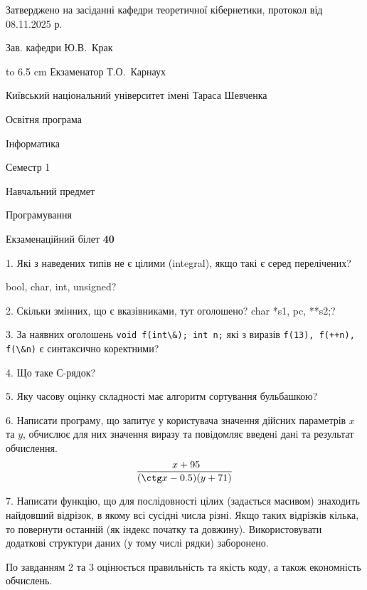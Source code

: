 \documentclass[12pt, ukrainian]{article}
\def\code#1{\Verb!#1!}
\begin{document}
{\smallskip\smallskip \begin {scriptsize} Затверджено на засіданні кафедри теоретичної кібернетики, протокол   від   08.11.2025 р.\par\smallskip\smallskip\smallskip\smallskip
{\parbox {6.5 cm} {Зав. кафедри \dotfill Ю.В.~Крак}}\hspace {0.7cm} {\hbox to 6.5 cm { Екзаменатор \dotfill Т.О.~Карнаух}} \end{scriptsize}}
\vspace{0.9cm}
{{\begin {scriptsize}\par
{ \center  Київський національний університет імені Тараса Шевченка \par}
{\parbox {5 cm}{Освітня програма \hfill}{\parbox {7 cm}{Інформатика\hfill}}\parbox {6 cm}{\hfill Семестр 1}}\par
{\parbox {5 cm} {Навчальний предмет \hfill}\parbox {7 cm}{Програмування \hfill}\parbox {6cm}{\hfill}\par}\vspace{-15pt} \end{scriptsize}}{\center Екзаменаційний білет \No \textbf { 40 }\par}}
{%
1. Які з наведених типів не є цілими (integral), якщо такі є серед перелічених?

bool, char, int, unsigned?
\par
\vspace{2mm}
2. Скільки змінних, що є вказівниками, тут оголошено?
char *s1, pc, **s2;?
\par
\vspace{2mm}
3. За наявних оголошень \code{void f(int\&); int n;} які з виразів \code{f(13), f(++n), f(\&n)} є синтаксично коректними?
\par
\vspace{2mm}
4. Що таке С-рядок?
\par
\vspace{2mm}
5. Яку часову оцінку складності має алгоритм сортування бульбашкою?
\par
\vspace{2mm}
6. Написати програму, що запитує у користувача значення дійсних параметрів $x$ та $y$, обчислює для них значення виразу та повiдомляє введенi данi та результат обчислення.
$$\frac{\ x + 95}{(\ctg x - 0.5) (y + 71)}$$ 

\par
7. Написати функцію, що для послідовності цілих (задається масивом) знаходить найдовший відрізок, в якому всі сусідні числа різні. Якщо таких відрізків кілька, то повернути останній (як індекс початку та довжину). Використовувати додаткові структури даних (у тому числі рядки) заборонено.

По завданням 2 та 3 оцінюється правильність та якість коду, а також економність обчислень.

}
\end{document}
